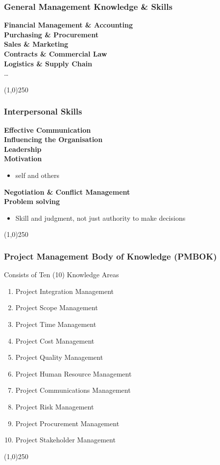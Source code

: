 \begin{frame}
\frametitle{General Management Knowledge \& Skills}
\textbf{Financial Management \& Accounting}\\
\textbf{Purchasing \& Procurement}\\
\textbf{Sales \& Marketing}\\
\textbf{Contracts \& Commercial Law}\\
\textbf{Logistics \& Supply Chain}\\
\ldots 
\end{frame}
\begin{center}\line(1,0){250}\end{center}



\begin{frame}
\frametitle{Interpersonal Skills}
\textbf{Effective Communication}\\
\textbf{Influencing the Organisation}\\
\textbf{Leadership}\\
\textbf{Motivation}  \\
\begin{itemize}
	\item self and others
\end{itemize}
\textbf{Negotiation \& Conflict Management}\\
\textbf{Problem solving} \\
\begin{itemize}
	\item Skill and judgment, not just authority to make decisions 
\end{itemize}
\end{frame}
\begin{center}\line(1,0){250}\end{center}



\begin{frame}
\frametitle{Project Management Body of Knowledge (PMBOK\textregistered)}
Consists of Ten (10) Knowledge Areas
\begin{enumerate}
\item Project Integration Management
\item Project Scope Management
\item Project Time Management
\item Project Cost Management
\item Project Quality Management
\item Project Human Resource Management
\item Project Communications Management
\item Project Risk Management
\item Project Procurement Management
\item Project Stakeholder Management
\end{enumerate}
\end{frame}
\begin{center}\line(1,0){250}\end{center}



